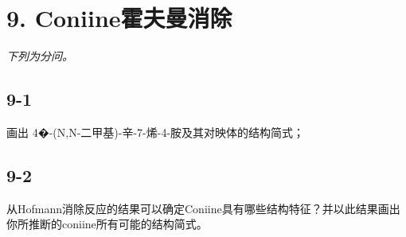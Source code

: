 \section*{9. Coniine霍夫曼消除}
\textit{下列为分问。}

\subsection*{9-1}
画出 4�-(N,N-⼆甲基)-⾟-7-烯-4-胺及其对映体的结构简式；

\subsection*{9-2}
从Hofmann消除反应的结果可以确定Coniine具有哪些结构特征？并以此结果画出你所推断的coniine所有可能的结构简式。
